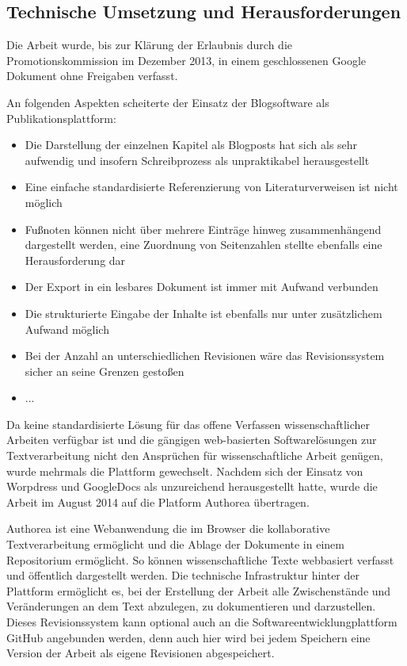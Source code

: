 \subsection{Technische Umsetzung und Herausforderungen}

Die Arbeit wurde, bis zur Klärung der Erlaubnis durch die Promotionskommission im Dezember 2013, in einem geschlossenen Google Dokument ohne Freigaben verfasst.

An folgenden Aspekten scheiterte der Einsatz der Blogsoftware als Publikationsplattform:
\begin{itemize}
\item Die Darstellung der einzelnen Kapitel als Blogposts hat sich als sehr aufwendig und insofern Schreibprozess als unpraktikabel herausgestellt
\item Eine einfache standardisierte Referenzierung von Literaturverweisen ist nicht möglich
\item Fußnoten können nicht über mehrere Einträge hinweg zusammenhängend dargestellt werden, eine Zuordnung von Seitenzahlen stellte ebenfalls eine Herausforderung dar
\item Der Export in ein lesbares Dokument ist immer mit Aufwand verbunden
\item Die strukturierte Eingabe der Inhalte ist ebenfalls nur unter zusätzlichem Aufwand möglich
\item Bei der Anzahl an unterschiedlichen Revisionen wäre das Revisionssystem sicher an seine Grenzen gestoßen
\item ...
\end{itemize}

Da keine standardisierte Lösung für das offene Verfassen wissenschaftlicher Arbeiten verfügbar ist und die gängigen web-basierten Softwarelösungen zur Textverarbeitung nicht den Ansprüchen für wissenschaftliche Arbeit genügen, wurde mehrmals die Plattform gewechselt. Nachdem sich der Einsatz von Worpdress und GoogleDocs als unzureichend herausgestellt hatte, wurde die Arbeit im August 2014 auf die Platform Authorea übertragen.

Authorea ist eine Webanwendung die im Browser die kollaborative Textverarbeitung ermöglicht und die Ablage der Dokumente in einem Repositorium ermöglicht. So können wissenschaftliche Texte webbasiert verfasst und öffentlich dargestellt werden. Die technische Infrastruktur hinter der Plattform ermöglicht es, bei der Erstellung der Arbeit alle Zwischenstände und Veränderungen an dem Text abzulegen, zu dokumentieren und darzustellen. Dieses Revisionssystem kann optional auch an die Softwareentwicklungplattform GitHub angebunden werden, denn auch hier wird bei jedem Speichern eine Version der Arbeit als eigene Revisionen abgespeichert.

